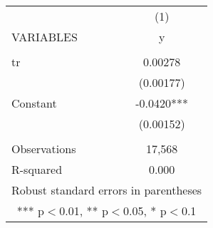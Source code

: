 \documentclass[]{article}
\begin{document}
\begin{tabular}{lc} \hline
 & (1) \\
VARIABLES & y \\ \hline
 &  \\
tr & 0.00278 \\
 & (0.00177) \\
Constant & -0.0420*** \\
 & (0.00152) \\
 &  \\
Observations & 17,568 \\
 R-squared & 0.000 \\ \hline
\multicolumn{2}{c}{ Robust standard errors in parentheses} \\
\multicolumn{2}{c}{ *** p$<$0.01, ** p$<$0.05, * p$<$0.1} \\
\end{tabular}
\end{document}
